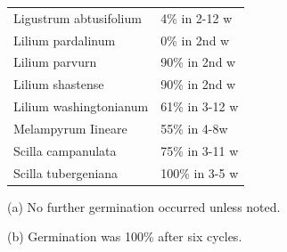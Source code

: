 \begin{table}[h]
\begin{tabular}{|l|l|}
Ligustrum abtusifolium & 4\% in 2-12 w \\
Lilium pardalinum & 0\% in 2nd w \\
Lilium parvurn & 90\% in 2nd w \\
Lilium shastense & 90\% in 2nd w \\
Lilium washingtonianum & 61\% in 3-12 w \\
Melampyrum Iineare & 55\% in 4-8w \\
Scilla campanulata & 75\% in 3-11 w \\
Scilla tubergeniana & 100\% in 3-5 w \\
\hline
\end{tabular}
\par
(a) No further germination occurred unless noted.

(b) Germination was 100\% after six cycles.
\label{table:g7040}
\end{table}

